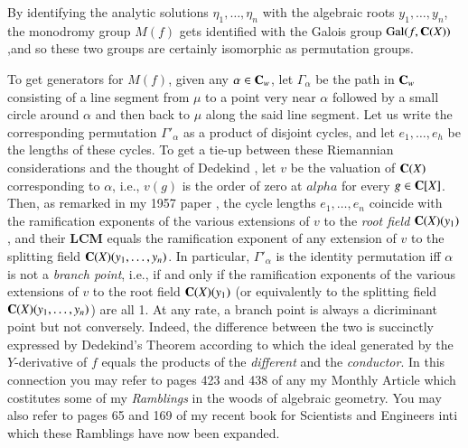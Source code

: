\newpage

By identifying the analytic solutions $\eta_{1}, \ldots, \eta_{n}$ with the algebraic roots $y_{1}, \ldots, y_{n}$, the monodromy group $M(f)$ gets identified with the Galois group $\operatorname{Gal}(f, \mathbf{C}(X))$,\pageoriginale and so these two groups are certainly isomorphic as permutation groups.

To get generators for $M(f)$, given any $\alpha \in \mathbf{C}_{w}$, let $\Gamma_{\alpha}$ be the path in $\mathbf{C}_{w}$ consisting of a line segment from $\mu$ to a point very near $\alpha$ followed by a small circle around $\alpha$ and then back to $\mu$ along the said line segment. Let us write the corresponding permutation $\Gamma'_{\alpha}$ as a product of disjoint cycles, and let $e_{1}, \ldots, e_{h}$ be the lengths of these cycles. To get a tie-up between  these Riemannian considerations and the  thought of Dedekind \cite{chap1-key28}, let $v$ be the valuation of $\mathbf{C}(X)$ corresponding to $\alpha$, i.e., $v(g)$ is the order of zero at $alpha$ for every $g\in \mathbf{C}[X]$. Then, as remarked in my 1957 paper \cite{chap1-key3}, the cycle lengths $e_{1}, \ldots, e_{n}$ coincide with the ramification exponents of the various extensions of $v$ to the \textit{root field} $\mathbf{C}(X)(y_{1})$, and their {\bf LCM} equals the ramification exponent of any extension of $v$ to the splitting field $\mathbf{C}(X)(y_{1}, \ldots,y_{n})$. In particular, $\Gamma'_{\alpha}$ is the identity permutation iff $\alpha$ is not a \textit{branch point}, i.e., if and only if the ramification exponents of the various extensions of $v$ to the root field $\mathbf{C}(X)(y_{1})$ (or equivalently to the splitting field $\mathbf{C}(X)(y_{1},\ldots, y_{n})$) are all 1. At any rate, a branch point is always a dicriminant point but not conversely. Indeed, the difference between the two is succinctly expressed by Dedekind's Theorem according to which the ideal generated by the $Y$-derivative of $f$ equals the products of the \textit{different} and the \textit{conductor}. In this connection you may refer to pages 423 and 438 of any my Monthly Article\cite{chap1-key5} which costitutes some of my \textit{Ramblings} in the woods of algebraic geometry. You may also refer to pages 65 and 169 of my recent book \cite{chap1-key6} for Scientists and Engineers inti which these Ramblings have now been expanded.
  
